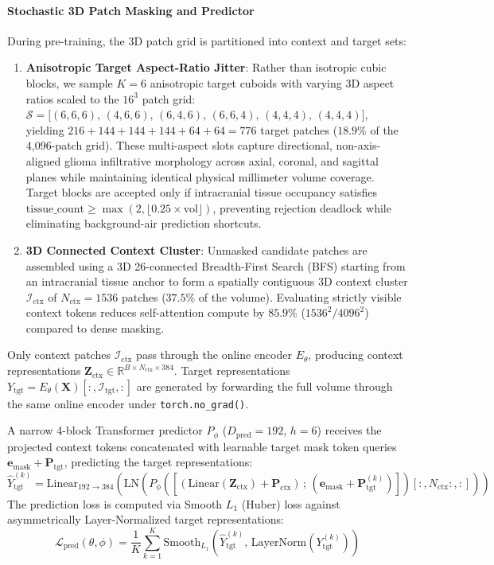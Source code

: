 \documentclass{article}
\begin{document}
\paragraph{Stochastic 3D Patch Masking and Predictor}
During pre-training, the 3D patch grid is partitioned into context and target sets:
\begin{enumerate}
    \item \textbf{Anisotropic Target Aspect-Ratio Jitter}: Rather than isotropic cubic blocks, we sample $K = 6$ anisotropic target cuboids with varying 3D aspect ratios scaled to the $16^3$ patch grid: $\mathcal{S} = \big[(6,6,6),\, (4,6,6),\, (6,4,6),\, (6,6,4),\, (4,4,4),\, (4,4,4)\big]$, yielding $216 + 144 + 144 + 144 + 64 + 64 = 776$ target patches ($18.9\%$ of the 4,096-patch grid). These multi-aspect slots capture directional, non-axis-aligned glioma infiltrative morphology across axial, coronal, and sagittal planes while maintaining identical physical millimeter volume coverage. Target blocks are accepted only if intracranial tissue occupancy satisfies $\text{tissue\_count} \ge \max(2, \lfloor 0.25 \times \text{vol} \rfloor)$, preventing rejection deadlock while eliminating background-air prediction shortcuts.
    \item \textbf{3D Connected Context Cluster}: Unmasked candidate patches are assembled using a 3D 26-connected Breadth-First Search (BFS) starting from an intracranial tissue anchor to form a spatially contiguous 3D context cluster $\mathcal{I}_{\text{ctx}}$ of $N_{\text{ctx}} = 1536$ patches ($37.5\%$ of the volume). Evaluating strictly visible context tokens reduces self-attention compute by $85.9\%$ ($1536^2 / 4096^2$) compared to dense masking.
\end{enumerate}
Only context patches $\mathcal{I}_{\text{ctx}}$ pass through the online encoder $E_\theta$, producing context representations $\mathbf{Z}_{\text{ctx}} \in \mathbb{R}^{B \times N_{\text{ctx}} \times 384}$. Target representations $Y_{\text{tgt}} = E_\theta(\mathbf{X})[:, \mathcal{I}_{\text{tgt}}, :]$ are generated by forwarding the full volume through the same online encoder under \texttt{torch.no\_grad()}.

A narrow 4-block Transformer predictor $P_\phi$ ($D_{\text{pred}} = 192$, $h = 6$) receives the projected context tokens concatenated with learnable target mask token queries $\mathbf{e}_{\text{mask}} + \mathbf{P}_{\text{tgt}}$, predicting the target representations:
\begin{equation}
    \hat{Y}_{\text{tgt}}^{(k)} = \text{Linear}_{192 \to 384}\left(\text{LN}\left(P_\phi\left(\left[(\text{Linear}(\mathbf{Z}_{\text{ctx}}) + \mathbf{P}_{\text{ctx}}) \,;\, (\mathbf{e}_{\text{mask}} + \mathbf{P}_{\text{tgt}}^{(k)})\right]\right)[:, N_{\text{ctx}}:, :]\right)\right)
\end{equation}
The prediction loss is computed via Smooth $L_1$ (Huber) loss against asymmetrically Layer-Normalized target representations:
\begin{equation}
    \mathcal{L}_{\text{pred}}(\theta, \phi) = \frac{1}{K} \sum_{k=1}^K \text{Smooth}_{L_1}\left(\hat{Y}_{\text{tgt}}^{(k)}, \, \text{LayerNorm}(Y_{\text{tgt}}^{(k)})\right)
\end{equation}
\end{document}
